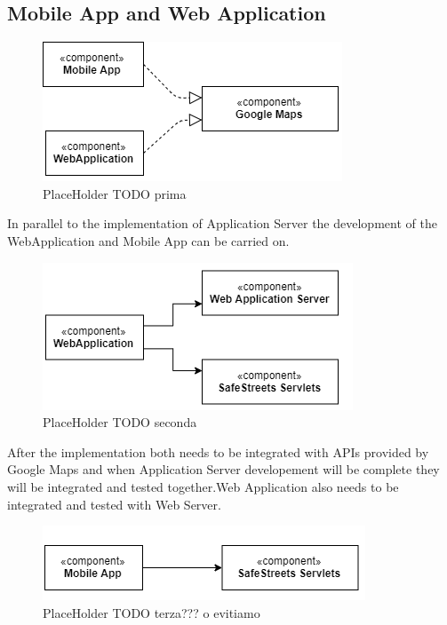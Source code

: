 \subsection{Mobile App and Web Application}
\begin{figure}[H]
\centering
\includegraphics{Images/IntegrationMaps.png}
\caption{\label{fig:ComWI}PlaceHolder TODO prima}
\end{figure}
In parallel to the implementation of Application Server the development of the WebApplication and Mobile App can be carried on.
\begin{figure}[H]
\centering
\includegraphics{Images/IntegrationWeb.png}
\caption{\label{fig:ComWI}PlaceHolder TODO seconda}
\end{figure}
After the implementation both needs to be integrated with APIs provided by Google Maps and when Application Server developement will be complete they will be integrated and tested together.Web Application also needs to be integrated and tested with Web Server.
\begin{figure}[H]
\centering
\includegraphics{Images/IntegrationMobile.png}
\caption{\label{fig:ComWI}PlaceHolder TODO terza??? o evitiamo}
\end{figure}
